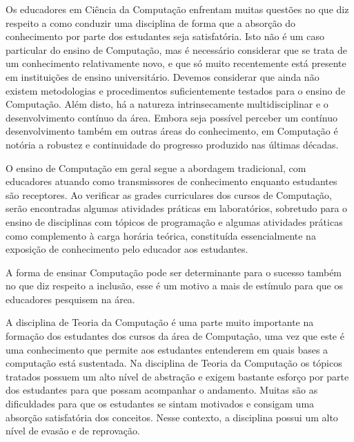 \newcommand{\publicacaoTemplate}[2]{%
\textbf{#1} : #2}


\acresetall
\label{cap-introducao}
Os educadores em Ciência da Computação enfrentam muitas questões no que diz
respeito a como conduzir uma disciplina de forma que a absorção do conhecimento
por parte dos estudantes seja satisfatória.
Isto não é um caso particular do ensino de Computação,
mas é necessário considerar que se trata de
um conhecimento relativamente novo, e que só muito
recentemente está presente em instituições de ensino universitário.
Devemos considerar que ainda não existem metodologias e procedimentos
suficientemente testados para o ensino de Computação.
Além disto, há a natureza intrinsecamente multidisciplinar e
o desenvolvimento contínuo da área.
Embora seja possível perceber um contínuo desenvolvimento também em
outras áreas do conhecimento, em Computação é notória a robustez e
continuidade do progresso produzido nas últimas décadas.

O ensino de Computação em geral segue a abordagem tradicional,
com educadores atuando como transmissores de conhecimento
enquanto estudantes são receptores.
Ao verificar as grades curriculares dos cursos de Computação,
serão encontradas algumas atividades práticas em laboratórios,
sobretudo para o ensino de disciplinas com tópicos de programação e
algumas atividades práticas como complemento à carga horária teórica,
constituída essencialmente na exposição de conhecimento pelo educador
aos estudantes.

A forma de ensinar Computação pode ser determinante
para o sucesso também no que diz respeito a
inclusão, esse é um motivo a mais de estímulo para
que os educadores pesquisem na área.

A disciplina de Teoria da Computação é uma parte muito importante
na formação dos estudantes dos cursos da área de Computação, uma 
vez que este é uma conhecimento que permite aos estudantes
entenderem em quais bases a computação está sustentada.
Na disciplina de Teoria da Computação os tópicos tratados
possuem um alto nível de abstração e exigem bastante esforço
por parte dos estudantes para que possam acompanhar o
andamento.
Muitas são as dificuldades para que os estudantes se sintam
motivados e consigam uma absorção satisfatória
dos conceitos.
Nesse contexto, a disciplina possui um alto nível de evasão e
de reprovação.

